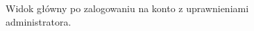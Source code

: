 \begin{figure}[H]
    \caption{Widok główny po zalogowaniu na konto z uprawnieniami administratora.}
    \label{widok:adminhome}
\end{figure}

